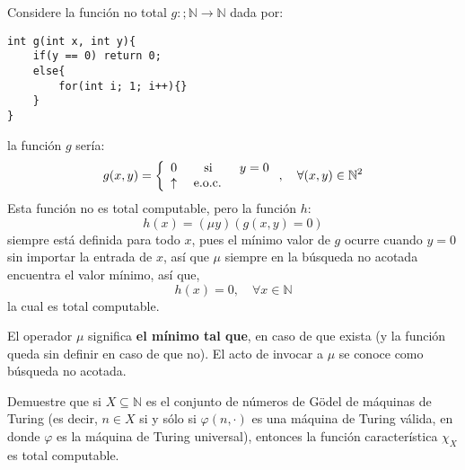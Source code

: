 \documentclass[12pt]{report}
\theoremstyle{largebreak}
\newcommand\cf[3]{\ensuremath{#1:#2\rightarrow#3}}
\begin{document}
    \begin{sol}
        Considere la función no total $\cf{g}{;\mathbb{N}}{\mathbb{N}}$ dada por:
        \begin{lstlisting}
int g(int x, int y){
    if(y == 0) return 0;
    else{
        for(int i; 1; i++){}
    }
}
        \end{lstlisting}
        la función $g$ sería:
        \begin{equation*}
            g(x,y)=\left\{
                \begin{array}{lcr}
                    0 & \textup{ si } & y=0\\
                    \uparrow & \textup{ e.o.c. } & \\
                \end{array}
            \right.,\quad\forall (x,y)\in\mathbb{N}^2
        \end{equation*}
        Esta función no es total computable, pero la función $h$:
        \begin{equation*}
            h(x)=(\mu y)(g(x,y)=0)
        \end{equation*}
        siempre está definida para todo $x$, pues el mínimo valor de $g$ ocurre cuando $y=0$ sin importar la entrada de $x$, así que $\mu$ siempre en la búsqueda no acotada encuentra el valor mínimo, así que,
        \begin{equation*}
            h(x)=0,\quad\forall x\in\mathbb{N}
        \end{equation*}
        la cual es total computable.
    \end{sol}

    \begin{mydef}
        El operador $\mu$ significa \textbf{el mínimo tal que}, en caso de que exista (y la función queda sin definir en caso de que no). El acto de invocar a $\mu$ se conoce como búsqueda no acotada.
    \end{mydef}

    \begin{excer}
        Demuestre que si $X\subseteq\mathbb{N}$ es el conjunto de números de Gödel de máquinas de Turing (es decir, $n\in X$ si y sólo si $\varphi(n,\cdot)$ es una máquina de Turing válida, en donde $\varphi$ es la máquina de Turing universal), entonces la función característica $\chi_X$ es total computable.
    \end{excer}
\end{document}
